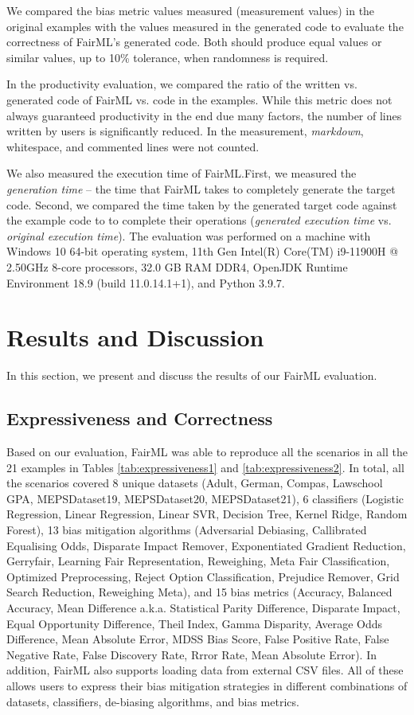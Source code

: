 \documentclass[sigconf,review]{acmart}
\begin{document}
We compared the bias metric values measured (measurement values) in the original examples with the values measured in the generated code to evaluate the correctness of FairML's generated code. Both should produce equal values or similar values, up to 10\% tolerance, when randomness is required.  

In the productivity evaluation, 
we compared the ratio of the written vs. generated code of FairML vs.
code in the examples. 
While this metric does not always guaranteed productivity in the end due many factors, 
the number of lines written by users is significantly reduced. In the measurement, \textit{markdown}, whitespace, and commented lines were not counted.

We also measured the execution time of FairML.First, we measured the \textit{generation time} -- the time that FairML takes to completely generate the target code. Second, we compared the time taken by the generated target code against the example code to to complete their operations (\textit{generated execution time} vs. \textit{original execution time}). The evaluation was performed on a machine with Windows 10 64-bit operating system, 11th Gen Intel(R) Core(TM) i9-11900H @ 2.50GHz 8-core processors, 32.0 GB RAM DDR4, OpenJDK Runtime Environment 18.9 (build 11.0.14.1+1), and Python 3.9.7.

\section{Results and Discussion}
\label{sec:result_and_discussion}
In this section, we present and discuss the results of our FairML evaluation.

\subsection{Expressiveness and Correctness}
\label{sec:expressiveness_and_correctness}
Based on our evaluation, FairML was able to reproduce all the scenarios in all the 21 examples in Tables \ref{tab:expressiveness1} and \ref{tab:expressiveness2}. In total, all the scenarios covered 8 unique datasets (Adult, German, Compas, Lawschool GPA, MEPSDataset19, MEPSDataset20, MEPSDataset21), 6 classifiers (Logistic Regression, Linear Regression, Linear SVR, Decision Tree, Kernel Ridge, Random Forest), 13 bias mitigation algorithms (Adversarial Debiasing, Callibrated Equalising Odds, Disparate Impact Remover, Exponentiated Gradient Reduction, Gerryfair, Learning Fair Representation, Reweighing, Meta Fair Classification, Optimized Preprocessing, Reject Option Classification, Prejudice Remover, Grid Search Reduction, Reweighing Meta), and 15 bias metrics (Accuracy, Balanced Accuracy, Mean Difference a.k.a. Statistical Parity Difference, Disparate Impact, Equal Opportunity Difference, Theil Index, Gamma Disparity, Average Odds Difference, Mean Absolute Error, MDSS Bias Score, False Positive Rate, False Negative Rate, False Discovery Rate, Rrror Rate, Mean Absolute Error). In addition, FairML also supports loading data from external CSV files. All of these allows users to express their bias mitigation strategies in different combinations of datasets, classifiers, de-biasing algorithms, and bias metrics.
\end{document}
